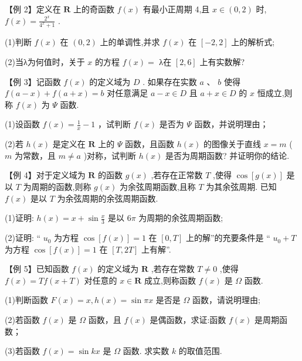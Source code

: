 【例 2】定义在 $\mathbf{R}$ 上的奇函数 $f\left( x\right)$ 有最小正周期 4,且 $x \in  \left( {0,2}\right)$ 时, $f\left( x\right)  = \frac{{2}^{x}}{{4}^{x} + 1}$ .

(1)判断 $f\left( x\right)$ 在 $\left( {0,2}\right)$ 上的单调性,并求 $f\left( x\right)$ 在 $\left\lbrack  {-2,2}\right\rbrack$ 上的解析式;

(2)当λ为何值时，关于 $x$ 的方程 $f\left( x\right)  =$ λ在 $\left\lbrack  {2,6}\right\rbrack$ 上有实数解?

【例 3】记函数 $f\left( x\right)$ 的定义域为 $D$ . 如果存在实数 $a\text{ 、 }b$ 使得 $f\left( {a - x}\right)  + f\left( {a + x}\right)  = b$ 对任意满足 $a - x \in  D$ 且 $a + x \in  D$ 的 $x$ 恒成立,则称 $f\left( x\right)$ 为 $\Psi$ 函数.

(1)设函数 $f\left( x\right)  = \frac{1}{x} - 1$ ，试判断 $f\left( x\right)$ 是否为 $\Psi$ 函数，并说明理由；

(2)若 $h\left( x\right)$ 是定义在 $\mathbf{R}$ 上的 $\Psi$ 函数，且函数 $h\left( x\right)$ 的图像关于直线 $x = m$ ( $m$ 为常数，且 $m \neq  a$ )对称，试判断 $h\left( x\right)$ 是否为周期函数? 并证明你的结论.

【例 4】对于定义域为 $\mathbf{R}$ 的函数 $g\left( x\right)$ ,若存在正常数 $T$ ,使得 $\cos \left\lbrack  {g\left( x\right) }\right\rbrack$ 是以 $T$ 为周期的函数,则称 $g\left( x\right)$ 为余弦周期函数,且称 $T$ 为其余弦周期. 已知 $f\left( x\right)$ 是以 $T$ 为余弦周期的余弦周期函数.

(1)证明: $h\left( x\right)  = x + \sin \frac{x}{3}$ 是以 ${6\pi }$ 为周期的余弦周期函数;

(2)证明: “ ${u}_{0}$ 为方程 $\cos \left\lbrack  {f\left( x\right) }\right\rbrack   = 1$ 在 $\left\lbrack  {0,T}\right\rbrack$ 上的解”的充要条件是 “ ${u}_{0} + T$ 为方程 $\cos \left\lbrack  {f\left( x\right) }\right\rbrack   = 1$ 在 $\left\lbrack  {T,{2T}}\right\rbrack$ 上有解”.

【例 5】已知函数 $f\left( x\right)$ 的定义域为 $\mathbf{R}$ ,若存在常数 $T \neq  0$ ,使得 $f\left( x\right)  = {Tf}\left( {x + T}\right)$ 对任意的 $x \in  \mathbf{R}$ 成立,则称函数 $f\left( x\right)$ 是 $\Omega$ 函数.

(1)判断函数 $F\left( x\right)  = x,h\left( x\right)  = \sin {\pi x}$ 是否是 $\Omega$ 函数，请说明理由;

(2)若函数 $f\left( x\right)$ 是 $\Omega$ 函数，且 $f\left( x\right)$ 是偶函数，求证:函数 $f\left( x\right)$ 是周期函数；

(3)若函数 $f\left( x\right)  = \sin {kx}$ 是 $\Omega$ 函数. 求实数 $k$ 的取值范围.

